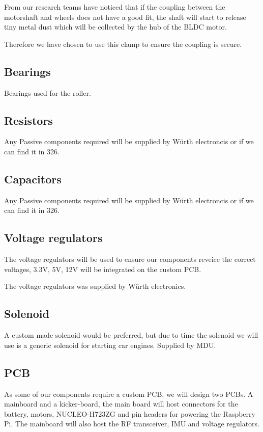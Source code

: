 \documentclass[a4paper,8pt]{article}
\begin{document}
  From our research teams have noticed that if the coupling between the
  motorshaft and wheels does not have a good fit, the shaft will start
  to release tiny metal dust which will be collected by the hub of the
  BLDC motor.

  Therefore we have chosen to use this clamp to ensure the coupling is
  secure.

  \subsection{Bearings}

  Bearings used for the roller.

  \subsection{Resistors}

  Any Passive components required will be supplied by Würth electroncis
  or if we can find it in 326.

  \subsection{Capacitors}

  Any Passive components required will be supplied by Würth electroncis
  or if we can find it in 326.

  \subsection{Voltage regulators}

  The voltage regulators will be used to ensure our components reveice
  the correct voltages, 3.3V, 5V, 12V will be integrated on the custom
  PCB.

  The voltage regulators was supplied by Würth electronics.

  \subsection{Solenoid}

  A custom made solenoid would be preferred, but due to time the
  solenoid we will use is a generic solenoid for starting car engines.
  Supplied by MDU.

  \subsection{PCB}

  As some of our components require a custom PCB, we will design two
  PCBs. A mainboard and a kicker-board, the main board will host
  connectors for the battery, motors, NUCLEO-H723ZG and pin headers for
  powering the Raspberry Pi. The mainboard will also host the RF
  transceiver, IMU and voltage regulators.
\end{document}
